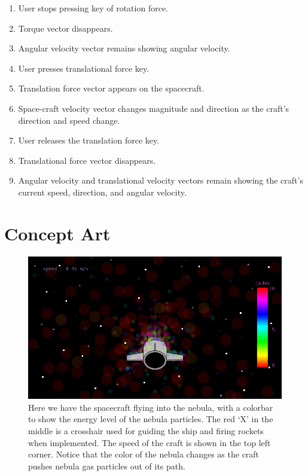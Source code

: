 \begin{enumerate}
\begin{enumerate}
  \item User stops pressing key of rotation force.

  \item Torque vector disappears.

  \item Angular velocity vector remains showing angular velocity.

  \item User presses translational force key.

  \item Translation force vector appears on the spacecraft.

  \item Space-craft velocity vector changes magnitude and direction as the craft's direction and speed change.

  \item User releases the translation force key.

  \item Translational force vector disappears.

  \item Angular velocity and translational velocity vectors remain showing the craft's current speed, direction, and angular velocity.

\end{enumerate}

\end{enumerate}

\section{Concept Art}

\begin{figure}[H]
  \centering
  \includegraphics[scale=0.5]{../../milestone2/images/10-nebula.png}
  \caption{Here we have the spacecraft flying into the nebula, with a colorbar to show the energy level of the nebula particles.  The red `X' in the middle is a crosshair used for guiding the ship and firing rockets when implemented.  The speed of the craft is shown in the top left corner.  Notice that the color of the nebula changes as the craft pushes nebula gas particles out of its path.}
\end{figure}

